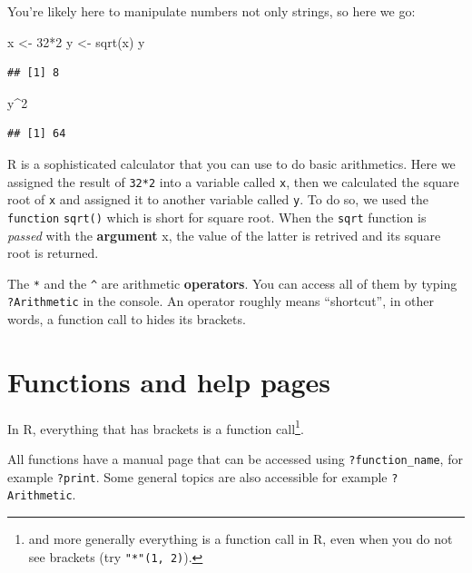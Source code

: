 \documentclass[
]{book}
\newenvironment{Shaded}{\begin{snugshade}}{\end{snugshade}}
\newcommand{\DecValTok}[1]{\textcolor[rgb]{0.00,0.00,0.81}{#1}}
\newcommand{\FunctionTok}[1]{\textcolor[rgb]{0.00,0.00,0.00}{#1}}
\newcommand{\NormalTok}[1]{#1}
\newcommand{\OtherTok}[1]{\textcolor[rgb]{0.56,0.35,0.01}{#1}}
\newcommand{\SpecialCharTok}[1]{\textcolor[rgb]{0.00,0.00,0.00}{#1}}
\begin{document}
You're likely here to manipulate numbers not only strings, so here we go:

\begin{Shaded}
\begin{Highlighting}[]
\NormalTok{x }\OtherTok{\textless{}{-}} \DecValTok{32}\SpecialCharTok{*}\DecValTok{2}
\NormalTok{y }\OtherTok{\textless{}{-}} \FunctionTok{sqrt}\NormalTok{(x)}
\NormalTok{y}
\end{Highlighting}
\end{Shaded}

\begin{verbatim}
## [1] 8
\end{verbatim}

\begin{Shaded}
\begin{Highlighting}[]
\NormalTok{y}\SpecialCharTok{\^{}}\DecValTok{2}
\end{Highlighting}
\end{Shaded}

\begin{verbatim}
## [1] 64
\end{verbatim}

R is a sophisticated calculator that you can use to do basic arithmetics. Here we assigned the result of \texttt{32*2} into a variable called \texttt{x}, then we calculated the square root of \texttt{x} and assigned it to another variable called \texttt{y}. To do so, we used the \texttt{function} \texttt{sqrt()} which is short for square root. When the \texttt{sqrt} function is \emph{passed} with the \textbf{argument} x, the value of the latter is retrived and its square root is returned.

The \texttt{*} and the \texttt{\^{}} are arithmetic \textbf{operators}. You can access all of them by typing \texttt{?Arithmetic} in the console. An operator roughly means ``shortcut'', in other words, a function call to hides its brackets.

\hypertarget{functions-and-help-pages}{%
\section{Functions and help pages}\label{functions-and-help-pages}}

In R, everything that has brackets is a function call\footnote{and more generally everything is a function call in R, even when you do not see brackets (try \texttt{"*"(1,\ 2)}).}.

All functions have a manual page that can be accessed using \texttt{?function\_name}, for example \texttt{?print}. Some general topics are also accessible for example \texttt{?Arithmetic}.
\end{document}
